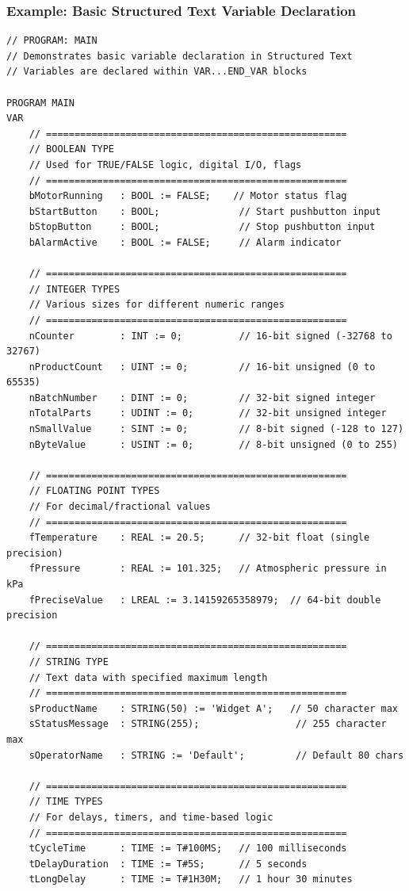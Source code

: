 \documentclass[11pt,a4paper]{article}
\begin{document}
\subsubsection*{Example: Basic Structured Text Variable Declaration}

\begin{lstlisting}
// PROGRAM: MAIN
// Demonstrates basic variable declaration in Structured Text
// Variables are declared within VAR...END_VAR blocks

PROGRAM MAIN
VAR
    // =====================================================
    // BOOLEAN TYPE
    // Used for TRUE/FALSE logic, digital I/O, flags
    // =====================================================
    bMotorRunning   : BOOL := FALSE;    // Motor status flag
    bStartButton    : BOOL;              // Start pushbutton input
    bStopButton     : BOOL;              // Stop pushbutton input
    bAlarmActive    : BOOL := FALSE;     // Alarm indicator
    
    // =====================================================
    // INTEGER TYPES
    // Various sizes for different numeric ranges
    // =====================================================
    nCounter        : INT := 0;          // 16-bit signed (-32768 to 32767)
    nProductCount   : UINT := 0;         // 16-bit unsigned (0 to 65535)
    nBatchNumber    : DINT := 0;         // 32-bit signed integer
    nTotalParts     : UDINT := 0;        // 32-bit unsigned integer
    nSmallValue     : SINT := 0;         // 8-bit signed (-128 to 127)
    nByteValue      : USINT := 0;        // 8-bit unsigned (0 to 255)
    
    // =====================================================
    // FLOATING POINT TYPES
    // For decimal/fractional values
    // =====================================================
    fTemperature    : REAL := 20.5;      // 32-bit float (single precision)
    fPressure       : REAL := 101.325;   // Atmospheric pressure in kPa
    fPreciseValue   : LREAL := 3.14159265358979;  // 64-bit double precision
    
    // =====================================================
    // STRING TYPE
    // Text data with specified maximum length
    // =====================================================
    sProductName    : STRING(50) := 'Widget A';   // 50 character max
    sStatusMessage  : STRING(255);                 // 255 character max
    sOperatorName   : STRING := 'Default';         // Default 80 chars
    
    // =====================================================
    // TIME TYPES
    // For delays, timers, and time-based logic
    // =====================================================
    tCycleTime      : TIME := T#100MS;   // 100 milliseconds
    tDelayDuration  : TIME := T#5S;      // 5 seconds
    tLongDelay      : TIME := T#1H30M;   // 1 hour 30 minutes
    

\end{lstlisting}
\end{document}
